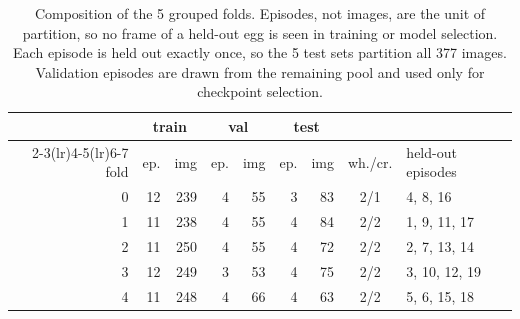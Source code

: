 \begin{table}[t]
\centering\small
\caption{Composition of the 5 grouped folds. Episodes, not images, are the unit of
partition, so no frame of a held-out egg is seen in training or model selection. Each
episode is held out exactly once, so the 5 test sets partition all 377 images.
Validation episodes are drawn from the remaining pool and used only for checkpoint
selection.}
\label{tab:folds}
\begin{tabular}{rrrrrrrcl}
\toprule
& \multicolumn{2}{c}{train} & \multicolumn{2}{c}{val} & \multicolumn{2}{c}{test} & & \\
\cmidrule(lr){2-3}\cmidrule(lr){4-5}\cmidrule(lr){6-7}
fold & ep. & img & ep. & img & ep. & img & wh./cr. & held-out episodes \\
\midrule
0 & 12 & 239 & 4 & 55 & 3 & 83 & 2/1 & 4, 8, 16 \\
1 & 11 & 238 & 4 & 55 & 4 & 84 & 2/2 & 1, 9, 11, 17 \\
2 & 11 & 250 & 4 & 55 & 4 & 72 & 2/2 & 2, 7, 13, 14 \\
3 & 12 & 249 & 3 & 53 & 4 & 75 & 2/2 & 3, 10, 12, 19 \\
4 & 11 & 248 & 4 & 66 & 4 & 63 & 2/2 & 5, 6, 15, 18 \\
\bottomrule
\end{tabular}
\end{table}
